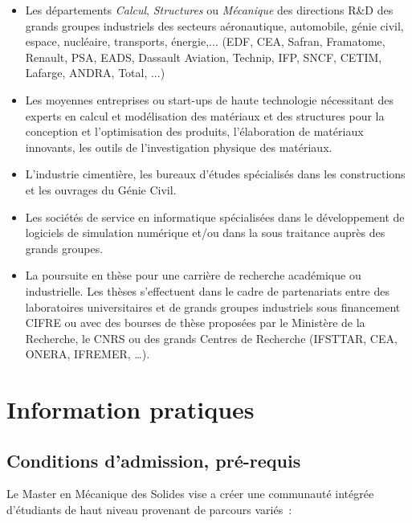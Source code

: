 \documentclass[french,11pt]{article}
\begin{document}
\begin{itemize}


\item
  Les départements \emph{Calcul}, \emph{Structures} ou \emph{Mécanique}
   des directions R\&D des grands groupes industriels des secteurs aéronautique,
  automobile, génie civil, espace, nucléaire, transports, énergie,...
  (EDF,  CEA, Safran, Framatome, Renault, PSA, EADS, Dassault Aviation, Technip,
  IFP, SNCF, CETIM, Lafarge, ANDRA, Total, ...)

\item Les moyennes entreprises ou start-ups de haute technologie nécessitant des experts en calcul et modélisation des matériaux et des structures pour la conception et l'optimisation des produits, l'élaboration de matériaux innovants, les outils de l’investigation physique des matériaux.

\item L’industrie cimentière, les bureaux d'études spécialisés dans les constructions et les ouvrages du Génie Civil.

\item   Les sociétés de service en informatique spécialisées dans le
  développement de logiciels de simulation numérique 
  et/ou dans la sous traitance auprès des grands groupes.
  
\item
  La poursuite en thèse pour une carrière de recherche académique ou industrielle.
  Les thèses s'effectuent dans le cadre de partenariats entre des
laboratoires universitaires et de grands groupes industriels sous
financement CIFRE ou avec des bourses de thèse proposées par le
Ministère de la Recherche, le CNRS ou des grands Centres de Recherche
(IFSTTAR, CEA, ONERA, IFREMER, \ldots).
\end{itemize}





\section{Information pratiques}
\subsection{Conditions d'admission, pré-requis}

Le Master en Mécanique des Solides vise a créer une communauté intégrée
d'étudiants de haut niveau provenant de parcours variés~:
\end{document}
